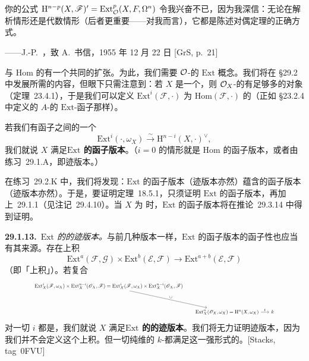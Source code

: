 \epigraph{你的公式 $\mathrm{H}^{n-p}(X,\mathscr{F})'=\mathrm{Ext}^p_{\mathcal{O}}(X,F,\Omega^n)$ 令我兴奋不已，因为我深信：无论在解析情形还是代数情形（后者更重要——对我而言），它都是陈述对偶定理的正确方式。}{——J.-P.~\trSerre，致 A.~\trGrothendieck{}书信，1955 年 12 月 22 日 [GrS, p.~21]}

\trVectorBundle{}与 $\mathrm{Hom}$ 的\trSerreDuality{}有一个共同的扩张。为此，我们需要 $\mathcal{O}$-\trModule{}的 $\mathrm{Ext}$ 概念。我们将在 \S29.2 中发展所需的内容，但眼下只需注意到：若 $X$ 是一个\trRingedSpace，则 $\mathcal{O}_X$-\trModule{}的\trCategory{}有足够多的\trInjective{}对象（\mbox{定理~23.4.1}），于是我们可以定义 $\mathrm{Ext}^i(\mathscr{F},\cdot)$ 为 $\mathrm{Hom}(\mathscr{F},\cdot)$ 的\trDerivedFunctor（正如 \S23.2.4 中定义的 $A$-\trModule{}的 $\mathrm{Ext}$-函子那样）。

若我们有函子之间的一个\trIsomorphism
\begin{equation*}\tag{29.1.12.1}\label{eq:ext-functorial-iso}
\boxed{\mathrm{Ext}^i(\cdot,\omega_X)\overset{\sim}{\longrightarrow}\mathrm{H}^{n-i}(X,\cdot)^{\vee},}
\end{equation*}
我们就说 $X$ 满足\textbf{$\mathrm{Ext}$ 的函子版本\trSerreDuality}。（$i=0$ 的情形就是 $\mathrm{Hom}$ 的函子版本\trSerreDuality，或者由\mbox{练习~29.1.A}，即迹版本。）

在\mbox{练习~29.2.K} 中，我们将发现：$\mathrm{Ext}$ 的函子版本\trSerreDuality（迹版本亦然）蕴含\trVectorBundle{}的函子版本\trSerreDuality（迹版本亦然）。于是，要证明\mbox{定理~18.5.1}，只须证明 $\mathrm{Ext}$ 的函子版本\trSerreDuality，再加上\mbox{\trDesideratum{}~29.1.1}（见\mbox{注记~29.4.10}）。当 $X$ 为 \trCM{}时，$\mathrm{Ext}$ 的函子版本\trSerreDuality{}将在\mbox{推论~29.3.14} 中得到证明。

\textbf{29.1.13.}\ \emph{$\mathrm{Ext}$ 的\trSerreDuality{}的迹版本。}\quad 与前几种版本一样，$\mathrm{Ext}$ 的函子版本\trSerreDuality{}的函子性也应当有其来源。存在上积
\[
\mathrm{Ext}^a(\mathscr{F},\mathscr{G})\times\mathrm{Ext}^b(\mathscr{E},\mathscr{F})\longrightarrow\mathrm{Ext}^{a+b}(\mathscr{E},\mathscr{F})
\]
（即「\trYoneda{}上积」）。若复合
\[
\resizebox{0.85\textwidth}{!}{\begin{tikzcd}[row sep=3.4em, column sep=1.6em, ampersand replacement=\&]
\mathrm{Ext}^i_X(\mathscr{F},\omega_X)\times\mathrm{Ext}^{n-i}_X(\mathscr{O}_X,\mathscr{F})=\mathrm{Ext}^i_X(\mathscr{F},\omega_X)\times\mathrm{Ext}^{n-i}_X(\mathscr{O}_X,\mathscr{F}) \ar[dr, "\cup"] \& \\
\& \mathrm{Ext}^n_X(\mathscr{O}_X,\omega_X)=\mathrm{H}^n(X,\omega_X) \ar[r, "t"] \& k
\end{tikzcd}}
\]
对一切 $i$ 都是\trPerfectPairing，我们就说 $X$ 满足\textbf{$\mathrm{Ext}$ 的\trSerreDuality{}的迹版本}。我们将无力证明迹版本，因为我们并不会定义这个上积。但一切纯维的\trProper{} \trCM{} $k$-\trScheme{}都满足这一强形式的\trDuality。[Stacks, tag~0FVU]

